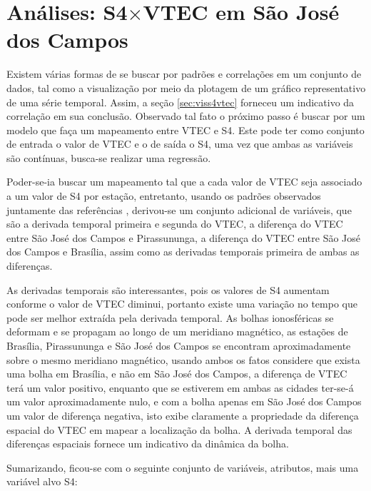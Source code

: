 \section{Análises: S4$\times$VTEC em São José dos Campos}

Existem várias formas de se buscar por padrões e correlações em um conjunto de dados, tal como a visualização por meio da plotagem de um gráfico representativo de uma série temporal. Assim, a seção \ref{sec:viss4vtec} forneceu um indicativo da correlação em sua conclusão. Observado tal fato o próximo passo é buscar por um modelo que faça um mapeamento entre VTEC e S4. Este pode ter como conjunto de entrada o valor de VTEC e o de saída o S4, uma vez que ambas as variáveis são contínuas, busca-se realizar uma regressão. 

Poder-se-ia buscar um mapeamento tal que a cada valor de VTEC seja associado a um valor de S4 por estação, entretanto, usando os padrões observados juntamente das referências \cite{}, derivou-se um conjunto adicional de variáveis, que são a derivada temporal primeira e segunda do VTEC, a diferença do VTEC entre São José dos Campos e Pirassununga, a diferença do VTEC entre São José dos Campos e Brasília, assim como as derivadas temporais primeira de ambas as diferenças. 

As derivadas temporais são interessantes, pois os valores de S4 aumentam conforme o valor de VTEC diminui, portanto existe uma variação no tempo que pode ser melhor extraída pela derivada temporal. As bolhas ionosféricas se deformam e se propagam ao longo de um meridiano magnético, as estações de Brasília, Pirassununga e São José dos Campos se encontram aproximadamente sobre o mesmo meridiano magnético, usando ambos os fatos considere que exista uma bolha em Brasília, e não em São José dos Campos, a diferença de VTEC terá um valor positivo, enquanto que se estiverem em ambas as cidades ter-se-á um valor aproximadamente nulo, e com a bolha apenas em São José dos Campos um valor de diferença negativa, isto exibe claramente a propriedade da diferença espacial do VTEC em mapear a localização da bolha. A derivada temporal das diferenças espaciais fornece um indicativo da dinâmica da bolha.

Sumarizando, ficou-se com o seguinte conjunto de variáveis, atributos, mais uma variável alvo S4:


